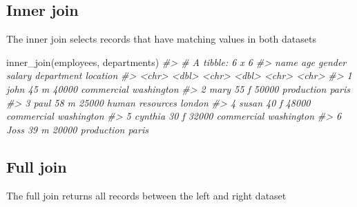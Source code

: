 \documentclass[
]{book}
\newenvironment{Shaded}{\begin{snugshade}}{\end{snugshade}}
\newcommand{\CommentTok}[1]{\textcolor[rgb]{0.56,0.35,0.01}{\textit{#1}}}
\newcommand{\FunctionTok}[1]{\textcolor[rgb]{0.00,0.00,0.00}{#1}}
\newcommand{\NormalTok}[1]{#1}
\begin{document}
\hypertarget{inner-join-1}{%
\subsection{Inner join}\label{inner-join-1}}

The inner join selects records that have matching values in both datasets

\begin{Shaded}
\begin{Highlighting}[]
\FunctionTok{inner\_join}\NormalTok{(employees, departments)}
\CommentTok{\#\textgreater{} \# A tibble: 6 x 6}
\CommentTok{\#\textgreater{}   name      age gender salary department      location  }
\CommentTok{\#\textgreater{}   \textless{}chr\textgreater{}   \textless{}dbl\textgreater{} \textless{}chr\textgreater{}   \textless{}dbl\textgreater{} \textless{}chr\textgreater{}           \textless{}chr\textgreater{}     }
\CommentTok{\#\textgreater{} 1 john       45 m       40000 commercial      washington}
\CommentTok{\#\textgreater{} 2 mary       55 f       50000 production      paris     }
\CommentTok{\#\textgreater{} 3 paul       58 m       25000 human resources london    }
\CommentTok{\#\textgreater{} 4 susan      40 f       48000 commercial      washington}
\CommentTok{\#\textgreater{} 5 cynthia    30 f       32000 commercial      washington}
\CommentTok{\#\textgreater{} 6 Joss       39 m       20000 production      paris}
\end{Highlighting}
\end{Shaded}

\hypertarget{full-join}{%
\subsection{Full join}\label{full-join}}

The full join returns all records between the left and right dataset
\end{document}
